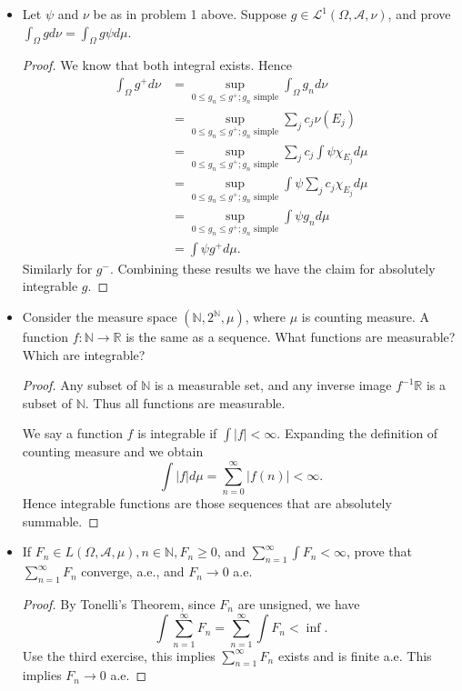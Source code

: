 \begin{itemize}
	\item Let $\psi$ and $\nu$ be as in problem 1 above. Suppose $g \in \mathcal{L}^1(\Omega, \mathcal{A}, \nu)$, and prove $\int _\Omega g d \nu = \int _\Omega g \psi d\mu$.
\begin{proof}
	We know that both integral exists. Hence
	\begin{align*}
		\int _\Omega g^+ d\nu
		&= \sup_{0\le g_n \le g^+; g_n \text{ simple}} \int _\Omega g_n d\nu\\
		&= \sup_{0\le g_n \le g^+; g_n \text{ simple}} \sum_{j} c_j\nu(E_j)\\
		&= \sup_{0\le g_n \le g^+; g_n \text{ simple}} \sum_{j} c_j\int \psi \chi_{E_j} d \mu\\
		&= \sup_{0\le g_n \le g^+; g_n \text{ simple}}  \int \psi\sum_{j} c_j\chi_{E_j} d \mu\\
		&= \sup_{0\le g_n \le g^+; g_n \text{ simple}}  \int \psi g_n d \mu\\
		&= \int \psi g^+ d \mu
	.\end{align*}
	Similarly for $g^-$. Combining these results we have the claim for absolutely integrable $g$.
\end{proof}



	\item Consider the measure space $(\mathbb{N}, 2^{\mathbb{N}}, \mu)$, where $\mu$ is counting measure. A function $f: \mathbb{N}\to \mathbb{R}$ is the same as a sequence. What functions are measurable? Which are integrable?
\begin{proof}
	Any subset of $\mathbb{N}$ is a measurable set, and any inverse image $f^{-1} \mathbb{R}$ is a subset of $\mathbb{N}$. Thus all functions are measurable.

	We say a function $f$ is integrable if $\int |f| < \infty $. Expanding the definition of counting measure and we obtain
	\[
		\int |f| d\mu = \sum_{n=0 }^{\infty} |f(n)| < \infty 
	.\] 
	Hence integrable functions are those sequences that are absolutely summable.
\end{proof}

	\item If $F_n \in L(\Omega, \mathcal{A}, \mu), n \in \mathbb{N}, F_n \ge 0$, and $\sum_{n=1}^{\infty} \int  F_n < \infty$, prove that $\sum_{n=1}^{\infty} F_n$ converge, a.e., and $F_n \to 0$ a.e.
\begin{proof}
	By Tonelli's Theorem, since $F_n$ are unsigned, we have
	\[
	 \int \sum_{n=1}^{\infty}F_n= 	\sum_{n=1}^{\infty} \int F_n  < \inf 
	.\] 
	Use the third exercise, this implies $\sum_{n=1}^{\infty} F_n$ exists and is finite a.e. This implies $F_n \to 0$ a.e.
\end{proof}


\end{itemize}

